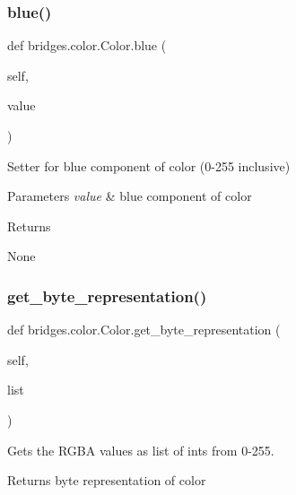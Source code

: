 \subsubsection{\texorpdfstring{blue()}{blue()}\hspace{0.1cm}{\footnotesize\ttfamily [2/2]}}
{\footnotesize\ttfamily def bridges.\+color.\+Color.\+blue (\begin{DoxyParamCaption}\item[{}]{self,  }\item[{}]{value }\end{DoxyParamCaption})}



Setter for blue component of color (0-\/255 inclusive) 


\begin{DoxyParams}{Parameters}
{\em value} & blue component of color \\
\hline
\end{DoxyParams}
\begin{DoxyReturn}{Returns}


None 
\end{DoxyReturn}
\mbox{\label{classbridges_1_1color_1_1_color_a30bc8e2023395c584eb256972abc7c1b}} 
\subsubsection{\texorpdfstring{get\+\_\+byte\+\_\+representation()}{get\_byte\_representation()}}
{\footnotesize\ttfamily def bridges.\+color.\+Color.\+get\+\_\+byte\+\_\+representation (\begin{DoxyParamCaption}\item[{}]{self,  }\item[{}]{list }\end{DoxyParamCaption})}



Gets the R\+G\+BA values as list of ints from 0-\/255. 

\begin{DoxyReturn}{Returns}
byte representation of color 
\end{DoxyReturn}
\mbox{\label{classbridges_1_1color_1_1_color_a86ec858a55491936054abcea865498ec}} 
